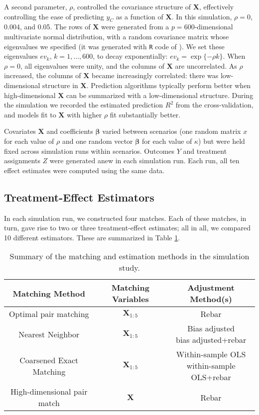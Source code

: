 \documentclass[12pt]{article}\usepackage[]{graphicx}\usepackage[]{color}
\newcommand{\covMat}{\bm{X}}
\newcommand{\covVec}{x}
\begin{document}
A second parameter, $\rho$, controlled the covariance structure of
$\covMat$, effectively controlling the ease of predicting $y_C$ as a
function of $\covMat$.
In this simulation, $\rho=$0, 0.004, and 0.05.
The rows of $\covMat$ were generated from a $p=$600-dimensional
multivariate normal distribution, with a random
covariance matrix whose eigenvalues we
specified (it was generated with \verb|R| code of \citealt{randomMatrix}).
We set these eigenvalues $ev_k$, $k=1,...,$600, to decay exponentially: $ev_k=\exp\{-\rho k\}$.
When $\rho=0$, all eigenvalues were unity, and the columns of $\covMat$ are
uncorrelated.
As $\rho$ increased, the columns of $\covMat$ became increasingly
correlated: there was low-dimensional structure in $\covMat$.
Prediction algorithms typically perform better when high-dimensional $\covMat$ can be summarized with a low-dimensional structure.
During the simulation we recorded the estimated
prediction $R^2$ from the cross-validation, and models fit to $\covMat$
with higher $\rho$ fit substantially better.

Covariates $\covMat$ and coefficients $\bm{\beta}$ varied between
scenarios (one random matrix $\covVec$ for each value of $\rho$ and one
random vector $\bm{\beta}$ for each value of $\kappa$)
but were held fixed across simulation runs within scenarios.
Outcomes $Y$ and treatment assignments $Z$ were generated anew in each
simulation run.
Each run, all ten effect estimates were computed using the same data.


\subsection{Treatment-Effect Estimators}\label{sec:sim-estimators}

In each simulation run, we constructed four matches.
Each of these matches, in turn, gave rise to two or three
treatment-effect estimates; all in all, we compared 10 different estimators.
These are summarized in Table \ref{tab:estimators}.

\begin{table}
  \begin{tabular}{ccc}
    \textbf{Matching Method}&\textbf{ Matching Variables} &\textbf{ Adjustment Method(s)}\\
    \hline
    \hline
    Optimal pair matching & $\covMat_{1:5}$& Rebar\\
    \hline
    Nearest Neighbor & $\covMat_{1:5}$& \makecell{Bias adjusted\\
    bias adjusted+rebar}\\
    \hline
    Coarsened Exact Matching & $\covMat_{1:5}$ &\makecell{Within-sample
                               OLS\\within-sample OLS+rebar}\\
    \hline
    High-dimensional pair match & $\covMat$ & Rebar\\
    \hline
 \end{tabular}
 \caption{Summary of the matching and estimation methods in the
   simulation study.}
 \label{tab:estimators}
\end{table}
\end{document}
